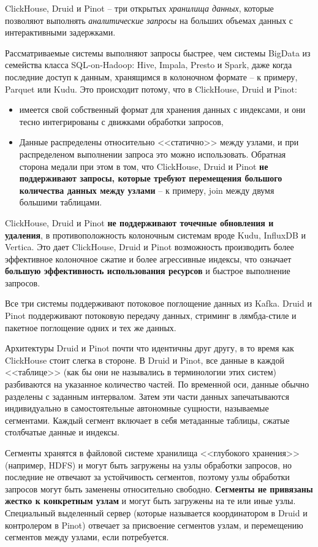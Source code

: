 \documentclass[%
	11pt,
	a4paper,
	utf8,
		]{article}
\begin{document}
ClickHouse, Druid и Pinot -- три открытых \emph{хранилища данных}, которые позволяют выполнять \emph{аналитические запросы} на больших объемах данных с интерактивными задержками.

Рассматриваемые системы выполняют запросы быстрее, чем системы BigData из семейства класса SQL-on-Hadoop: Hive, Impala, Presto и Spark, даже когда последние доступ к данным, хранящимся в колоночном формате -- к примеру, Parquet или Kudu. Это происходит потому, что в ClickHouse, Druid и Pinot:
\begin{itemize}
	\item имеется свой собственный формат для хранения данных с индексами, и они тесно интегрированы с движками обработки запросов,
	
	\item Данные распределены относительно <<статично>> между узлами, и при распределеном выполнении запроса это можно использовать. Обратная сторона медали при этом в том, что ClickHouse, Druid и Pinot \textbf{не поддерживают запросы, которые требуют перемещения большого количества данных между узлами} -- к примеру, join между двумя большими таблицами.
\end{itemize}

ClickHouse, Druid и Pinot \textbf{не поддерживают точечные обновления и удаления}, в противоположность колоночным системам вроде Kudu, InfluxDB и Vertica. Это дает ClickHouse, Druid и Pinot возможность производить более эффективное колоночное сжатие и более агрессивные индексы, что означает \textbf{большую эффективность использования ресурсов} и быстрое выполнение запросов.

Все три системы поддерживают потоковое поглощение данных из Kafka. Druid и Pinot поддерживают потоковую передачу данных, стриминг в лямбда-стиле и пакетное поглощение одних и тех же данных.

Архитектуры Druid и Pinot почти что идентичны друг другу, в то время как ClickHouse стоит слегка в стороне. В Druid и Pinot, все данные в каждой <<таблице>> (как бы они не назывались в терминологии этих систем) разбиваются на указанное количество частей. По временной оси, данные обычно разделены с заданным интервалом. Затем эти части данных запечатываются индивидуально в самостоятельные автономные сущности, называемые сегментами. Каждый сегмент включает в себя метаданные таблицы, сжатые столбчатые данные и индексы.

Сегменты хранятся в файловой системе хранилища <<глубокого хранения>> (например, HDFS) и могут быть загружены на узлы обработки запросов, но последние не отвечают за устойчивость сегментов, поэтому узлы обработки запросов могут быть заменены относительно свободно. \textbf{Сегменты не привязаны жестко к конкретным узлам} и могут быть загружены на те или иные узлы. Специальный выделенный сервер (которые называется координатором в Druid и контролером в Pinot) отвечает за присвоение сегментов узлам, и перемещению сегментов между узлами, если потребуется.
\end{document}
